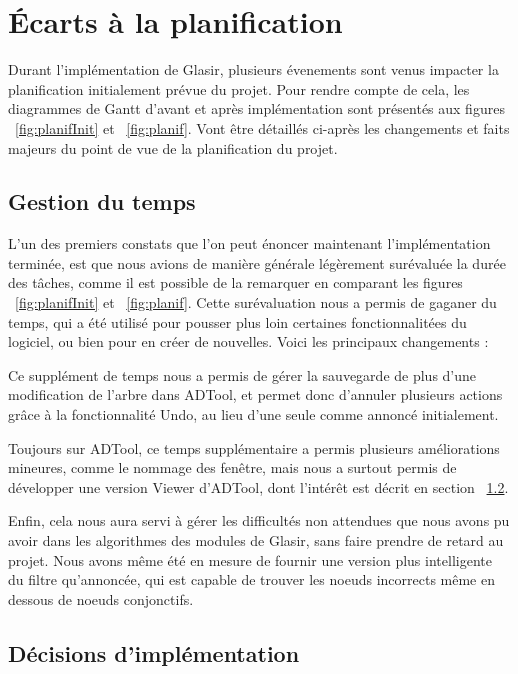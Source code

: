 \section{Écarts à la planification}
\label{sec:ecarts}

Durant l'implémentation de Glasir, plusieurs évenements sont venus impacter la planification initialement prévue du projet. Pour rendre compte de cela, les diagrammes de Gantt d'avant et après implémentation sont présentés aux figures ~\ref{fig:planifInit} et  ~\ref{fig:planif}. Vont être détaillés ci-après les changements et faits majeurs du point de vue de la planification du projet. 

\subsection{Gestion du temps}

L'un des premiers constats que l'on peut énoncer maintenant l'implémentation terminée, est que nous avions de manière générale légèrement surévaluée la durée des tâches, comme il est possible de la remarquer en comparant les figures ~\ref{fig:planifInit} et  ~\ref{fig:planif}. Cette surévaluation nous a permis de gaganer du temps, qui a été utilisé pour pousser plus loin certaines fonctionnalitées du logiciel, ou bien pour en créer de nouvelles. Voici les principaux changements :

Ce supplément de temps nous a permis de gérer la sauvegarde de plus d'une modification de l'arbre dans ADTool, et permet donc d'annuler plusieurs actions grâce à la fonctionnalité Undo, au lieu d'une seule comme annoncé initialement.

Toujours sur ADTool, ce temps supplémentaire a permis plusieurs améliorations mineures, comme le nommage des fenêtre, mais nous a surtout permis de développer une version \og Viewer \fg d'ADTool, dont l'intérêt est décrit en section ~\ref{sec:decisions}.

Enfin, cela nous aura servi à gérer les difficultés non attendues que nous avons pu avoir dans les algorithmes des modules de Glasir, sans faire prendre de retard au projet. Nous avons même été en mesure de fournir une version plus intelligente du filtre qu'annoncée, qui est capable de trouver les noeuds incorrects même en dessous de noeuds conjonctifs.  

\subsection{Décisions d'implémentation}
\label{sec:decisions}

